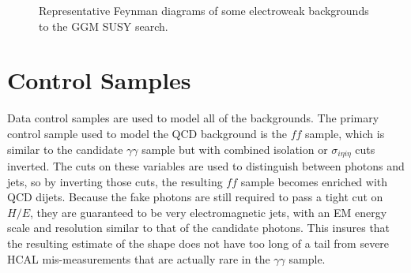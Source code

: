 \documentclass[dissertation_bw.tex]{subfiles}
\begin{document}
\begin{figure}
	\caption{Representative Feynman diagrams of some electroweak backgrounds to the GGM SUSY search.}
	\label{fig:EW_background_diagrams}
\end{figure}



\section{Control Samples}
\label{sec:Control Samples}

Data control samples are used to model all of the backgrounds.  The primary control sample used to model the QCD background is the $\mathit{ff}$ sample, which is similar to the candidate $\gamma\gamma$ sample but with combined isolation or $\sigma_{i\eta i\eta}$ cuts inverted.  The cuts on these variables are used to distinguish between photons and jets, so by inverting those cuts, the resulting $\mathit{ff}$ sample becomes enriched with QCD dijets.  Because the fake photons are still required to pass a tight cut on $H/E$, they are guaranteed to be very electromagnetic jets, with an EM energy scale and resolution similar to that of the candidate photons.  This insures that the resulting estimate of the \MET shape does not have too long of a tail from severe HCAL mis-measurements that are actually rare in the $\gamma\gamma$ sample.

\end{document}
